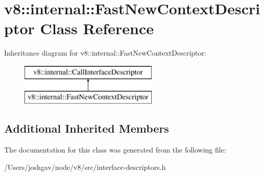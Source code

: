 \hypertarget{classv8_1_1internal_1_1_fast_new_context_descriptor}{}\section{v8\+:\+:internal\+:\+:Fast\+New\+Context\+Descriptor Class Reference}
\label{classv8_1_1internal_1_1_fast_new_context_descriptor}
Inheritance diagram for v8\+:\+:internal\+:\+:Fast\+New\+Context\+Descriptor\+:\begin{figure}[H]
\begin{center}
\leavevmode
\includegraphics[height=2.000000cm]{classv8_1_1internal_1_1_fast_new_context_descriptor}
\end{center}
\end{figure}
\subsection*{Additional Inherited Members}


The documentation for this class was generated from the following file\+:\begin{DoxyCompactItemize}
\item 
/\+Users/joshgav/node/v8/src/interface-\/descriptors.\+h\end{DoxyCompactItemize}
